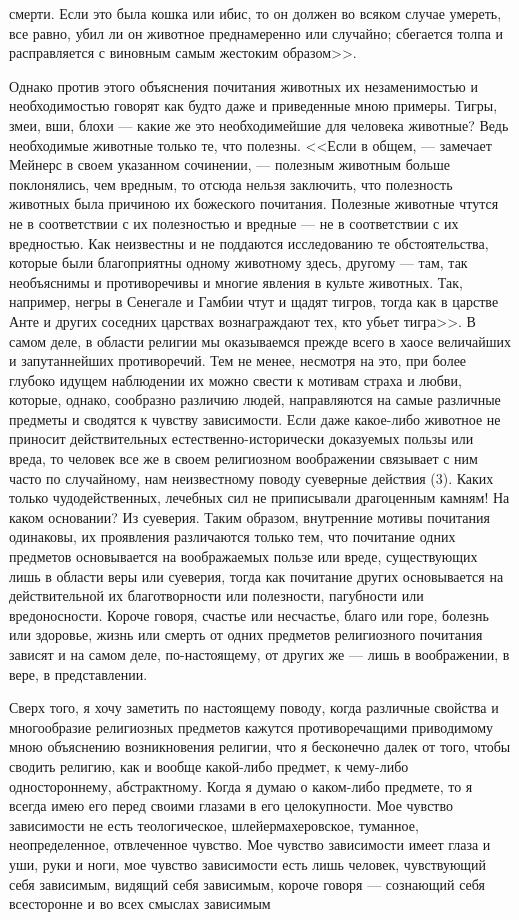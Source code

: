 \documentclass[12pt]{article}
\begin{document}
смерти. Если это была кошка или ибис, то он должен во всяком случае умереть, все равно, убил ли он животное преднамеренно или случайно; сбегается толпа и расправляется с виновным самым жестоким образом>>. 

Однако против этого объяснения почитания животных их незаменимостью и необходимостью говорят как будто даже и приведенные мною примеры. Тигры, змеи, вши, блохи --- какие же это необходимейшие для человека животные? Ведь необходимые животные только те, что полезны. <<Если в общем, --- замечает Мейнерс в своем указанном сочинении, --- полезным животным больше поклонялись, чем вредным, то отсюда нельзя заключить, что полезность животных была причиною их божеского почитания. Полезные животные чтутся не в соответствии с их полезностью и вредные --- не в соответствии с их вредностью. Как неизвестны и не поддаются исследованию те обстоятельства, которые были благоприятны одному животному здесь, другому --- там, так необъяснимы и противоречивы и многие явления в культе животных. Так, например, негры в Сенегале и Гамбии чтут и щадят тигров, тогда как в царстве Анте и других соседних царствах вознаграждают тех, кто убьет тигра>>. В самом деле, в области религии мы оказываемся прежде всего в хаосе величайших и запутаннейших противоречий. Тем не менее, несмотря на это, при более глубоко идущем наблюдении их можно свести к мотивам страха и любви, которые, однако, сообразно различию людей, направляются на самые различные предметы и сводятся к чувству зависимости. Если даже какое-либо животное не приносит действительных естественно-исторически доказуемых пользы или вреда, то человек все же в своем религиозном воображении связывает с ним часто по случайному, нам неизвестному поводу суеверные действия (3). Каких только чудодейственных, лечебных сил не приписывали драгоценным камням! На каком основании? Из суеверия. Таким образом, внутренние мотивы почитания одинаковы, их проявления различаются только тем, что почитание одних предметов основывается на воображаемых пользе или вреде, существующих лишь в области веры или суеверия, тогда как почитание других основывается на действительной их благотворности или полезности, пагубности или вредоносности. Короче говоря, счастье или несчастье, благо или горе, болезнь или здоровье, жизнь или смерть от одних предметов религиозного почитания зависят и на самом деле, по-настоящему, от других же --- лишь в воображении, в вере, в представлении. 

Сверх того, я хочу заметить по настоящему поводу, когда различные свойства и многообразие религиозных предметов кажутся противоречащими приводимому мною объяснению возникновения религии, что я бесконечно далек от того, чтобы сводить религию, как и вообще какой-либо предмет, к чему-либо одностороннему, абстрактному. Когда я думаю о каком-либо предмете, то я всегда имею его перед своими глазами в его целокупности. Мое чувство зависимости не есть теологическое, шлейермахеровское, туманное, неопределенное, отвлеченное чувство. Мое чувство зависимости имеет глаза и уши, руки и ноги, мое чувство зависимости есть лишь человек, чувствующий себя зависимым, видящий себя зависимым, короче говоря --- сознающий себя всесторонне и во всех смыслах зависимым 
\end{document}
